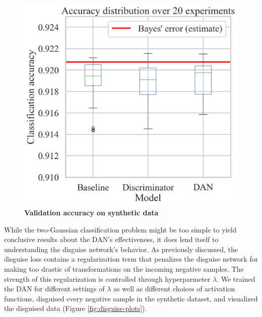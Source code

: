 \documentclass{proc}
\begin{document}
\begin{figure}[h!]
	\begin{center}
		\includegraphics*[scale=0.45]{../figures/model-comparison.png}
		\caption{\textbf{Validation accuracy on synthetic data}}
		\label{fig:model-comparison}
	\end{center}
\end{figure}

While the two-Gaussian classification problem might be too simple to yield conclusive results about the DAN's effectiveness, it does lend itself to understanding the disguise network's behavior. As previously discussed, the disguise loss contains a regularization term that penalizes the disguise network for making too drastic of transformations on the incoming negative samples. The strength of this regularization is controlled through hyperparmeter $\lambda$. We trained the DAN for different settings of $\lambda$ as well as different choices of activation functions, disguised every negative sample in the synthetic dataset, and visualized the disguised data (Figure \ref{fig:disguise-plots}).
\end{document}
